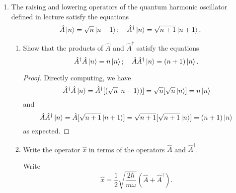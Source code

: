 \documentclass[11pt]{article}
\newcommand{\br}[1]{\left(#1\right)}
\newcommand{\sbr}[1]{\left[#1\right]}
\begin{document}
\begin{enumerate}[label=27.\arabic*]
\begin{proof}
\begin{align*}
            &= \frac{\hbar\omega}{2}\br{\hat{A}^{\dagger}\sbr{\hat{A}, \hat{A}} + \sbr{\hat{A}^{\dagger}, \hat{A}}\hat{A} +  \hat{A}\sbr{\hat{A}^{\dagger}, \hat{A}} + \sbr{\hat{A}, \hat{A}}\hat{A}^{\dagger}}\\
            &= \frac{\hbar\omega}{2}\br{-1\hat{A} +  \hat{A}(-1)} = -\hbar\omega\hat{A},
        \end{align*} and \begin{align*}
            \sbr{\hat{H}, \hat{A}^{\dagger}} = \sbr{\frac{\hbar\omega}{2}\br{\hat{A}^{\dagger}\hat{A} + \hat{A}\hat{A}^{\dagger}}, \hat{A}^{\dagger}} &= \frac{\hbar\omega}{2}\br{\sbr{\hat{A}^{\dagger}\hat{A}, \hat{A}^{\dagger}} + \sbr{\hat{A}\hat{A}^{\dagger}, \hat{A}^{\dagger}}}\\
            &= \frac{\hbar\omega}{2}\br{\hat{A}^{\dagger}\sbr{\hat{A}, \hat{A}^{\dagger}} + \sbr{\hat{A}^{\dagger}, \hat{A}^{\dagger}}\hat{A} +  \hat{A}\sbr{\hat{A}^{\dagger}, \hat{A}^{\dagger}} + \sbr{\hat{A}, \hat{A}^{\dagger}}\hat{A}^{\dagger}}\\
            &= \frac{\hbar\omega}{2}\br{\hat{A}^{\dagger}1 + 1\hat{A}^{\dagger}} = \hbar\omega\hat{A},
        \end{align*} which is equation (27.6) as desired.
    \end{proof}
    \item The raising and lowering operators of the quantum harmonic oscillator defined in lecture satisfy the equations \[\hat{A}\ket{n} = \sqrt{n}\ket{n-1};\quad \hat{A}^{\dagger}\ket{n} =\sqrt{n+1}\ket{n+1}.\]
    \begin{enumerate}[label=(\alph*)]
        \item Show that the products of $\hat{A}$ and $\hat{A}^{\dagger}$ satisfy the equations \[\hat{A}^{\dagger}\hat{A} \ket{n} = n\ket{n};\quad \hat{A}\hat{A}^{\dagger}\ket{n} = (n+1)\ket{n}.\]
        \begin{proof}
            Directly computing, we have \[\hat{A}^{\dagger}\hat{A} \ket{n} = \hat{A}^{\dagger}[(\sqrt{n}\ket{n-1})]= \sqrt{n}[\sqrt{n}\ket{n}] = n\ket{n}\] and \[\hat{A}\hat{A}^{\dagger}\ket{n} = \hat{A}[\sqrt{n+1}\ket{n+1}] = \sqrt{n+1}[\sqrt{n+1}\ket{n}] = (n+1)\ket{n}\]
            as expected.
        \end{proof}
        \item Write the operator $\hat{x}$ in terms of the operators $\hat{A}$ and $\hat{A}^{\dagger}$.
        
        Write \[\hat{x} = \frac{1}{2}\sqrt{\frac{2\hbar}{m\omega}}\br{\hat{A} + \hat{A}^{\dagger}}.\]


\end{enumerate}
\end{enumerate}
\end{document}
